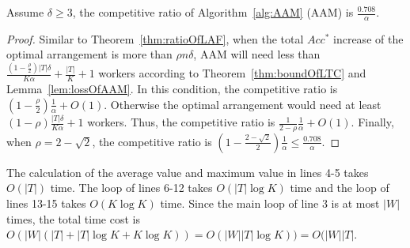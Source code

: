 \begin{theorem}
Assume $\delta \ge 3$, the competitive ratio of Algorithm~\ref{alg:AAM} (AAM) is $\frac{0.708}{\alpha}$.
\end{theorem}
\begin{proof}
Similar to Theorem~\ref{thm:ratioOfLAF}, when the total $Acc^{*}$ increase of the optimal arrangement is more than $\rho n\delta$, AAM will need less than
$\frac{(1-\frac{\rho}{2})|T|\delta}{K\alpha} + \frac{|T|}{K} + 1$ workers according to Theorem~\ref{thm:boundOfLTC} and Lemma~\ref{lem:lossOfAAM}.
In this condition, the competitive ratio is $(1-\frac{\rho}{2})\frac{1}{\alpha} + O(1)$.
Otherwise the optimal arrangement would need at least $(1-\rho)\frac{|T|\delta}{K\alpha} + 1$ workers.
Thus, the competitive ratio is $\frac{1}{2-\rho} \frac{1}{\alpha} + O(1)$.
Finally, when $\rho = 2 - \sqrt{2}$, the competitive ratio is $(1 - \frac{2 - \sqrt{2}}{2}) \frac{1}{\alpha} \le \frac{0.708}{\alpha}$.
\end{proof}	
	
The calculation of the average value and maximum value in lines 4-5 takes $O(|T|)$ time.
The loop of lines 6-12 takes $O(|T|\log{K})$ time and the loop of lines 13-15 takes $O(K\log{K})$ time.
Since the main loop of line 3 is at most $|W|$ times, the total time cost is $O(|W|(|T| + |T|\log{K} + K\log{K})) = O(|W||T|\log{K})) = O(|W||T|$.
